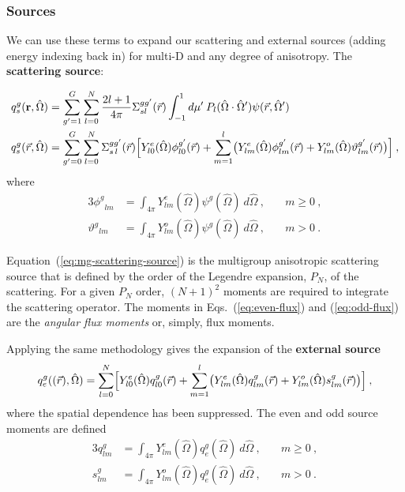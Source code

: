 \documentclass[12pt]{article}
\newcommand{\ve}[1]{\ensuremath{\mathbf{#1}}}
\newcommand{\Macro}{\ensuremath{\Sigma}}
\newcommand{\vecr}{\ensuremath{\vec{r}}}
\newcommand{\vOmega}{\ensuremath{\hat{\Omega}}}
\newcommand{\even}{\ensuremath{\phi^g}}
\newcommand{\odd}{\ensuremath{\vartheta^g}}
\newcommand{\evenp}{\ensuremath{\phi^{g'}}}
\newcommand{\oddp}{\ensuremath{\vartheta^{g'}}}
\newcommand{\sigg}[1]{\ensuremath{\Macro^{gg'}_{s\,#1}}}
\begin{document}
\subsubsection*{Sources}
We can use these terms to expand our scattering and external sources (adding energy indexing back in) for multi-D and any degree of anisotropy. The \textbf{scattering source}:


\begin{align}
q^g_{s}(\ve{r},\vOmega) &= \sum_{g'=1}^G \sum_{l=0}^{N} \frac{2l+1}{4 \pi} \Sigma^{gg'}_{sl}(\vecr) \int_{-1}^1 d\mu'\: P_l(\vOmega \cdot \vOmega') \psi(\vecr, \vOmega')\\
  q^g_{s}(\vec{r},\vOmega) &= \sum_{g'=0}^G
  \sum_{l=0}^N
  \sigg{l}(\vec{r})
  \Bigl[
  Y^e_{l0}(\vOmega)\evenp_{l0}(\vec{r}) +
  \sum_{m=1}^l
  \bigl(
  Y^e_{lm}(\vOmega)\evenp_{lm}(\vec{r}) +
  Y^o_{lm}(\vOmega)\oddp_{lm}(\vec{r})
  \bigr)\Bigr]\:,
  \label{eq:mg-scattering-source}
\end{align}
where
\begin{alignat}{3}
  \even_{lm} &= \int_{4\pi}Y^e_{lm}(\vOmega)\psi^g(\vOmega)\:d\vOmega\:,
  \quad& m\ge 0\:,\label{eq:even-flux}\\
  \odd_{lm} &= \int_{4\pi}Y^o_{lm}(\vOmega)\psi^g(\vOmega)\:d\vOmega\:,
  \quad& m>0\:.\label{eq:odd-flux}
\end{alignat}


Equation~(\ref{eq:mg-scattering-source}) is the multigroup anisotropic
scattering source that is defined by the order of the Legendre expansion,
$P_N$, of the scattering.  For a given $P_N$ order, $(N+1)^2$ moments are
required to integrate the scattering operator.  The moments in
Eqs.~(\ref{eq:even-flux}) and (\ref{eq:odd-flux}) are the \textit{angular flux moments} or, simply, flux moments.
  
Applying the same methodology gives the expansion of the \textbf{external source}
\begin{equation}
  q^g_e((\vec{r}), \vOmega) = \sum_{l=0}^{N}\Bigl[
  Y^e_{l0}(\vOmega)q^g_{l0}(\vec{r}) +
  \sum_{m=1}^{l}
  \bigr(
  Y^e_{lm}(\vOmega)q^g_{lm}(\vec{r}) + Y^o_{lm}(\vOmega)s^g_{lm}(\vec{r})\bigr)
  \Bigr]\:,
  \label{eq:mg-external-source}
\end{equation}
where the spatial dependence has been suppressed.  The even and odd source
moments are defined
\begin{alignat}{3}
  q^g_{lm} &= \int_{4\pi}Y^e_{lm}(\vOmega)q^g_e(\vOmega)\:d\vOmega\:,
  \quad&m\ge 0\:,\label{eq:even-source}\\
  s^g_{lm} &= \int_{4\pi}Y^o_{lm}(\vOmega)q^g_e(\vOmega)\:d\vOmega\:,
  \quad&m>0\:.\label{eq:odd-source}
\end{alignat}
\end{document}
